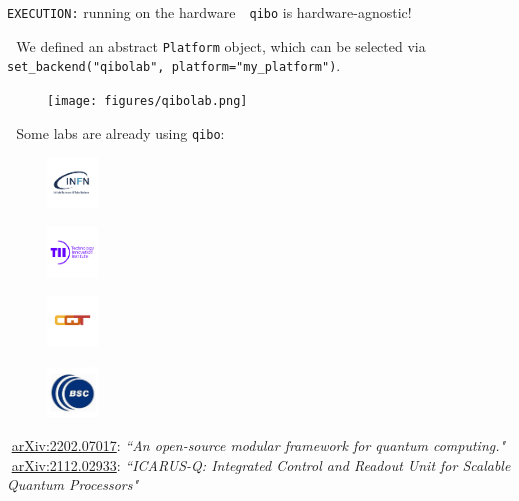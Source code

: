 \documentclass[9pt, xcolor={svgnames}, hyperref={colorlinks, linkcolor=black, citecolor=amethyst, urlcolor=amethyst}]{beamer}
\begin{document}
\begin{frame}{\texttt{EXECUTION:} running on the hardware}
\small
\faArrowCircleRight\,\, \texttt{qibo} is hardware-agnostic!
\pause

\faArrowCircleRight\,\, We defined an abstract \texttt{Platform} object, which can
be selected via \texttt{set\_backend("qibolab", platform="my\_platform")}. 
\begin{figure}
    \texttt{[image: figures/qibolab.png]}
\end{figure}

\pause
\faArrowCircleRight\,\, Some labs are already using \texttt{qibo}:
\begin{multicols}{4}
\begin{figure}
    \centering 
    \includegraphics[width=0.12\textwidth]{figures/infn.png}
\end{figure}
\begin{figure}
    \centering 
    \includegraphics[width=0.12\textwidth]{figures/tii.png}
\end{figure}
\begin{figure}
    \centering 
    \includegraphics[width=0.12\textwidth]{figures/cqt.png}
\end{figure}
\begin{figure}
    \centering 
    \includegraphics[width=0.12\textwidth]{figures/bsc.jpg}
\end{figure}
\end{multicols}
\pause
\footnotesize
\faBook\,\,\href{https://arxiv.org/abs/2202.07017}{arXiv:2202.07017}: \textit{``An open-source modular framework for quantum computing."}
\faBook\,\,\href{https://arxiv.org/abs/2112.02933}{arXiv:2112.02933}: \textit{``ICARUS-Q: Integrated Control and Readout Unit for Scalable Quantum Processors"}\\

\end{frame}
\end{document}
